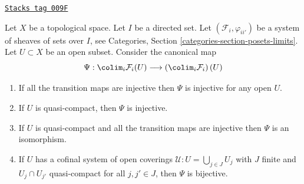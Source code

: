 \begin{lemma}
\label{sheaves-lemma-directed-colimits-sections}
\href{https://stacks.math.columbia.edu/tag/009F}{\texttt{Stacks tag 009F}}

Let $X$ be a topological space. Let $I$ be a directed set.
Let $(\mathcal{F}_i, \varphi_{ii'})$ be a system of sheaves of sets
over $I$, see
Categories, Section \ref{categories-section-posets-limits}.
Let $U \subset X$ be an open subset.
Consider the canonical map
$$
\Psi :
\colim_i \mathcal{F}_i(U)
\longrightarrow
\left(\colim_i \mathcal{F}_i\right)(U)
$$
\begin{enumerate}
\item If all the transition maps are injective then
$\Psi$ is injective for any open $U$.
\item If $U$ is quasi-compact, then $\Psi$ is injective.
\item If $U$ is quasi-compact and all the transition maps are injective
then $\Psi$ is an isomorphism.
\item If $U$ has a cofinal system of open coverings
$\mathcal{U} : U = \bigcup_{j\in J} U_j$ with
$J$ finite and $U_j \cap U_{j'}$ quasi-compact
for all $j, j' \in J$, then $\Psi$ is bijective.
\end{enumerate}
\end{lemma}

